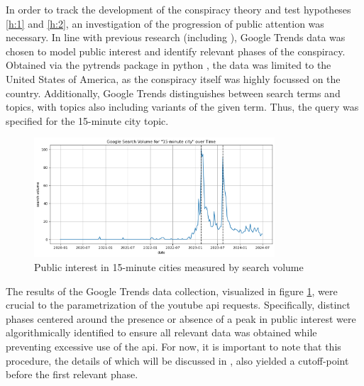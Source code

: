 \documentclass[fontsize=11pt, parskip=half]{scrartcl}
\begin{document}
    In order to track the development of the conspiracy theory and test hypotheses \ref{h:1} and \ref{h:2}, an investigation of the progression of public attention was necessary. In line with previous research (including \cite{mavraganiAssessingMethodsTools2018,yeoPublicAttentionLocal2019,junTenYearsResearch2018a}), Google Trends data was chosen to model public interest and identify relevant phases of the conspiracy. Obtained via the pytrends package \parencite{dreyco676Pytrends2023} in python \parencite{vanrossumPythonReferenceManual2009}, the data was limited to the United States of America, as the conspiracy itself was highly focussed on the country. Additionally, Google Trends distinguishes between search terms and topics, with topics also including variants of the given term. Thus, the query was specified for the 15-minute city topic.

    \begin{figure}{}
        \centering
        \setlength\intextsep{0pt}
        \includegraphics[width=0.8\textwidth]{img/gtrends_2-peak.png}
        \vspace{-5pt}
        \caption{Public interest in 15-minute cities measured by search volume}
        \vspace{-10pt}
        \label{fig:gtrends_raw}
    \end{figure}

    The results of the Google Trends data collection, visualized in figure \ref{fig:gtrends_raw}, were crucial to the parametrization of the youtube api requests. Specifically, distinct phases centered around the presence or absence of a peak in public interest were algorithmically identified to ensure all relevant data was obtained while preventing excessive use of the api. For now, it is important to note that this procedure, the details of which will be discussed in , also yielded a cutoff-point before the first relevant phase.
\end{document}
